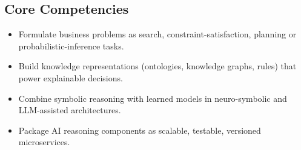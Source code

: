 \documentclass[10pt,a4paper]{article}
\begin{document}
\subsection*{Core Competencies}\begin{itemize}\small
\item Formulate business problems as search, constraint-satisfaction, planning or probabilistic-inference tasks.
\item Build knowledge representations (ontologies, knowledge graphs, rules) that power explainable decisions.
\item Combine symbolic reasoning with learned models in neuro-symbolic and LLM-assisted architectures.
\item Package AI reasoning components as scalable, testable, versioned microservices.
\end{itemize}
\end{document}
